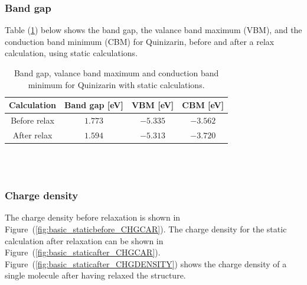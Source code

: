 \documentclass{article}
\begin{document}
      \vspace{1cm}

    \subsubsection{Band gap}

      Table (\ref{tab:bandgapquinizarin}) below shows the band gap, the valance band maximum (VBM), and the conduction band minimum (CBM) for Quinizarin, before and after a relax calculation, using static calculations. \\

      \begin{table}[H]
        \centering
        \caption{Band gap, valance band maximum and conduction band minimum for Quinizarin with static calculations. }
        \label{tab:bandgapquinizarin}
        \begin{tabular}{|c|c|c|c|}
            \hline
            Calculation & Band gap [eV] & VBM [eV] & CBM [eV]  \\
            \hline \hline
            Before relax & $1.773$ & $-5.335$ & $-3.562$ \\
            After relax & $1.594$ & $-5.313$ & $-3.720$ \\
            \hline
        \end{tabular} \\
        \hspace{0pt}\\
      \end{table}

      \vspace{1cm}

    \subsubsection{Charge density}

      The charge density before relaxation is shown in Figure~(\ref{fig:basic_staticbefore_CHGCAR}). The charge density for the static calculation after relaxation can be shown in Figure~(\ref{fig:basic_staticafter_CHGCAR}).
      Figure~(\ref{fig:basic_staticafter_CHGDENSITY}) shows the charge density of a single molecule after having relaxed the structure. \\
\end{document}
